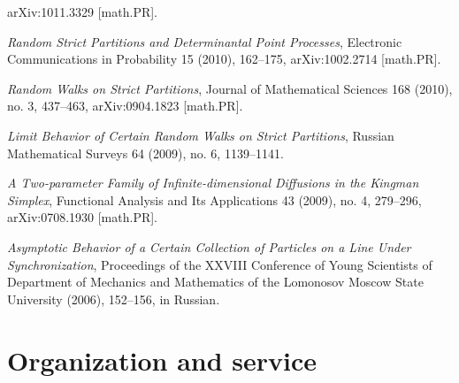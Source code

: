 \documentclass[letterpaper,11pt]{article}
\begin{document}
\begin{etaremune}
	      arXiv:1011.3329 [math.PR].
	\item
	      \emph{Random Strict Partitions and Determinantal Point
		      Processes},
	      Electronic Communications in Probability 15 (2010), 162--175,
	      arXiv:1002.2714 [math.PR].
	\item
	      \emph{Random Walks on Strict Partitions}, Journal of
	      Mathematical Sciences 168 (2010), no. 3, 437--463,
	      arXiv:0904.1823 [math.PR].
	\item
	      \emph{Limit Behavior of Certain Random Walks on Strict
		      Partitions},
	      Russian Mathematical Surveys 64 (2009), no. 6, 1139--1141.
	\item
	      \emph{A Two-parameter Family of Infinite-dimensional Diffusions
		      in the Kingman Simplex}, Functional Analysis and Its
	      Applications 43 (2009), no. 4, 279--296, arXiv:0708.1930
	      [math.PR].
	\item
	      \emph{Asymptotic Behavior of a Certain Collection of Particles
		      on a Line Under Synchronization}, Proceedings of the XXVIII
	      Conference of Young Scientists of Department of Mechanics and
	      Mathematics of the Lomonosov Moscow State University (2006), 152--156, in
	      Russian.
\end{etaremune}

\section*{Organization and service}
\end{document}
